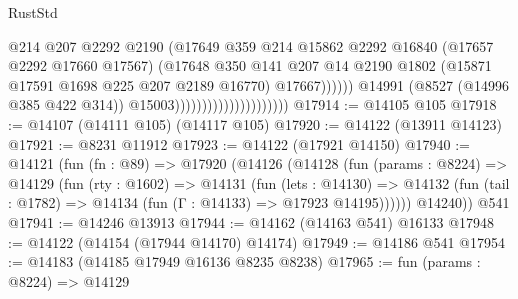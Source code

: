 \begin{lexlean}{RustStd}
\begin{coremodule}
                                                      @214
                                                      @207
                                                      @2292
                                                      @2190
                                                      (@17649
                                                        @359
                                                        @214
                                                        @15862
                                                        @2292
                                                        @16840
                                                        (@17657 @2292 @17660 @17567)
                                                        (@17648
                                                          @350
                                                          @141
                                                          @207
                                                          @14
                                                          @2190
                                                          @1802
                                                          (@15871
                                                            @17591
                                                            @1698
                                                            @225
                                                            @207
                                                            @2189
                                                            @16770)
                                                          @17667))))))
                                              @14991
                                              (@8527 (@14996 @385 @422 @314))
                                              @15003)))))))))))))))))))))
@17914 := @14105 @105
@17918 := @14107 (@14111 @105) (@14117 @105)
@17920 := @14122 (@13911 @14123)
@17921 := @8231 @11912
@17923 := @14122 (@17921 @14150)
@17940 := @14121
    (fun (fn : @89) =>
    @17920
      (@14126
        (@14128
          (fun (params : @8224) =>
          @14129
            (fun (rty : @1602) =>
            @14131
              (fun (lets : @14130) =>
              @14132 (fun (tail : @1782) => @14134 (fun (Γ : @14133) => @17923 @14195))))))
        @14240))
    @541
@17941 := @14246 @13913
@17944 := @14162 (@14163 @541) @16133
@17948 := @14122 (@14154 (@17944 @14170) @14174)
@17949 := @14186 @541
@17954 := @14183 (@14185 @17949 @16136 @8235 @8238)
@17965 := fun (params : @8224) =>
  @14129

\end{coremodule}
\end{lexlean}
